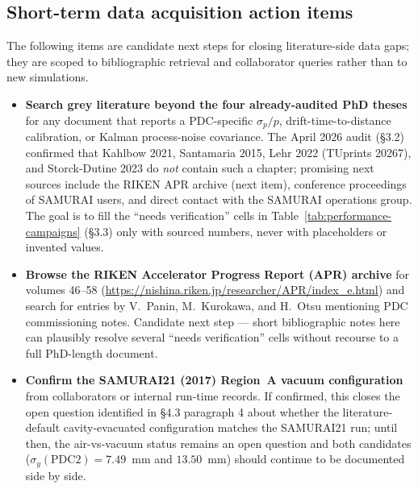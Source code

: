 \documentclass[a4paper, 11pt]{article}
\begin{document}
\subsection{Short-term data acquisition action items}
The following items are candidate next steps for closing literature-side data gaps; they are scoped to bibliographic retrieval and collaborator queries rather than to new simulations.
\begin{itemize}
  \item \textbf{Search grey literature beyond the four already-audited PhD theses} for any document that reports a PDC-specific $\sigma_p/p$, drift-time-to-distance calibration, or Kalman process-noise covariance. The April 2026 audit (§3.2) confirmed that Kahlbow 2021, Santamaria 2015, Lehr 2022 (TUprints 20267), and Storck-Dutine 2023 do \emph{not} contain such a chapter; promising next sources include the RIKEN APR archive (next item), conference proceedings of SAMURAI users, and direct contact with the SAMURAI operations group. The goal is to fill the ``needs verification'' cells in Table~\ref{tab:performance-campaigns} (§3.3) only with sourced numbers, never with placeholders or invented values.
  \item \textbf{Browse the RIKEN Accelerator Progress Report (APR) archive} for volumes 46--58 (\url{https://nishina.riken.jp/researcher/APR/index_e.html}) and search for entries by V.~Panin, M.~Kurokawa, and H.~Otsu mentioning PDC commissioning notes. Candidate next step --- short bibliographic notes here can plausibly resolve several ``needs verification'' cells without recourse to a full PhD-length document.
  \item \textbf{Confirm the SAMURAI21 (2017) Region~A vacuum configuration} from collaborators or internal run-time records. If confirmed, this closes the open question identified in §4.3 paragraph 4 about whether the literature-default cavity-evacuated configuration matches the SAMURAI21 run; until then, the air-vs-vacuum status remains an open question and both candidates ($\sigma_y(\text{PDC2}) = 7.49$~mm and $13.50$~mm) should continue to be documented side by side.
\end{itemize}
\end{document}
